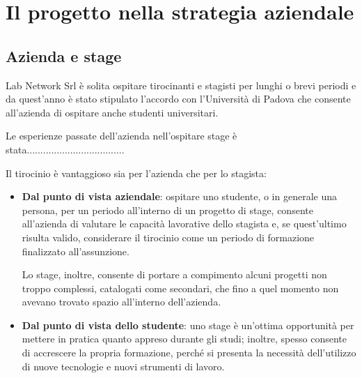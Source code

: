 
\chapter{Il progetto nella strategia aziendale}
\label{cap:processi-metodologie}

\section{Azienda e stage}

Lab Network Srl è solita ospitare tirocinanti e stagisti per lunghi o brevi periodi e da quest'anno è stato stipulato l'accordo con l'Università di Padova che consente all'azienda di ospitare anche studenti universitari.

Le esperienze passate dell'azienda nell'ospitare stage è stata....................................

Il tirocinio è vantaggioso sia per l'azienda che per lo stagista:
\begin{itemize}
\item \textbf{Dal punto di vista aziendale}: ospitare uno studente, o in generale una persona, per un periodo all'interno di un progetto di stage, consente all'azienda di valutare le capacità lavorative dello stagista e, se quest'ultimo risulta valido, considerare il tirocinio come un periodo di formazione finalizzato all'assunzione.

Lo stage, inoltre, consente di portare a compimento alcuni progetti non troppo complessi, catalogati come secondari, che fino a quel momento non avevano trovato spazio all'interno dell'azienda.
\item \textbf{Dal punto di vista dello studente}: uno stage è un'ottima opportunità per mettere in pratica quanto appreso durante gli studi; inoltre, spesso consente di accrescere la propria formazione, perché si presenta la necessità dell'utilizzo di nuove tecnologie e nuovi strumenti di lavoro.
\end{itemize}


